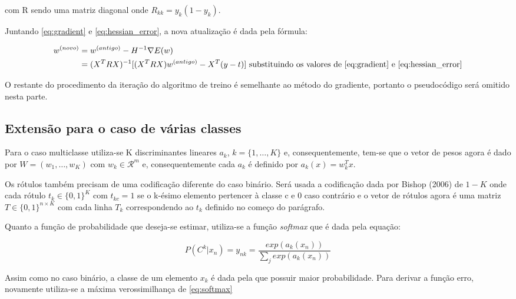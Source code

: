 com R sendo uma matriz diagonal onde $R_{kk} = y_k(1 - y_k)$.

Juntando \ref{eq:gradient} e \ref{eq:hessian_error}, a nova atualização é dada pela fórmula:


\begin{equation}
	\begin{split}
		w^{ (novo) } & = w^{ (antigo) } - H^{-1} \nabla E(w) \\
		& = (X^T R X)^{-1}[(X^T R X)w^{ (antigo) } - X^T(y - t)] \text{ substituindo os valores de \ref{eq:gradient} e \ref{eq:hessian_error}} 
	\end{split}
\end{equation}

O restante do procedimento da iteração do algoritmo de treino é semelhante ao método do gradiente,
portanto o pseudocódigo será omitido nesta parte.

\subsection{Extensão para o caso de várias classes}

Para o caso multiclasse utiliza-se K discriminantes lineares $a_k$, $k = \{1, \ldots, K\}$ e,
consequentemente, tem-se que o vetor de pesos agora é dado por $W = (w_1, \ldots, w_K)$ com
$w_k \in \mathcal{R}^m$ e, consequentemente cada $a_k$ é definido por $a_k(x) = w_k^Tx$.

Os rótulos também precisam de uma codificação diferente do caso binário. Será usada a codificação
dada por Bishop (2006)\cite{bishop2006} de $1-K$ onde cada rótulo $t_k \in \{0, 1\}^K$ com
$t_{kc} = 1$ se o k-ésimo elemento pertencer à classe c e 0 caso contrário e o vetor de rótulos
agora é uma matriz $T \in \{0, 1\}^{n \times K}$ com cada linha $T_k$ correspondendo ao
$t_k$ definido no começo do parágrafo.

Quanto a função de probabilidade que deseja-se estimar, utiliza-se a função
\textit{softmax} que é dada pela equação:

\begin{center}
	\begin{equation}
		\label{eq:softmax}
		P(C^k | x_n) = y_{nk} = \frac{exp(a_k(x_n))}{\sum_j exp(a_k(x_n))} 
	\end{equation}
\end{center}

Assim como no caso binário, a classe de um elemento $x_k$ é dada pela que possuir maior probabilidade.
Para derivar a função erro, novamente utiliza-se a máxima verossimilhança de \ref{eq:softmax}

